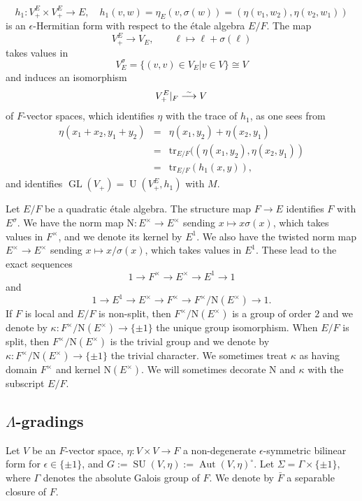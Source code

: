 \documentclass{article}
\def\tx#1{\textrm{#1}}
\def\simto{\buildrel\hbox{\tiny{$\sim$}}\over\longrightarrow}
\DeclareMathOperator{\GL}{GL}
\theoremstyle{definition}
\numberwithin{equation}{subsection}
\renewcommand{\-}{\hyp{}}
\DeclareMathOperator{\SU}{SU}
\DeclareMathOperator{\U}{U}
\DeclareMathOperator{\Aut}{Aut}
\newcommand{\rN}{\mathrm{N}}
\begin{document}
\begin{enumerate}
	\[ h_1 : V_+^E \times V_+^E \to E,\quad h_1(v,w) = \eta_E(v,\sigma(w))=(\eta(v_1,w_2),\eta(v_2,w_1)) \]
	is an $\epsilon$-Hermitian form with respect to the \'etale algebra $E/F$. The map
	\[ V_+^E \to V_E,\qquad \ell \mapsto \ell+\sigma(\ell) \]
	takes values in 
	\[ V_E^\sigma = \{(v,v) \in V_E|v \in V\} \cong V \]
	and induces an isomorphism
	\[ V_+^E|_F \simto V \]
	of $F$-vector spaces, which identifies $\eta$ with the trace of $h_1$, as one sees from 
	\begin{eqnarray*}
		\eta(x_1+x_2,y_1+y_2)&=&\eta(x_1,y_2)+\eta(x_2,y_1)\\
		&=&\tx{tr}_{E/F}((\eta(x_1,y_2),\eta(x_2,y_1))\\
		&=&\tx{tr}_{E/F}(h_1(x,y)),
	\end{eqnarray*}
	and identifies $\GL(V_+)=\U(V_+^E,h_1)$ with $M$.
\end{enumerate}

Let $E/F$ be a quadratic \'etale algebra. The structure map $F \to E$ identifies $F$ with $E^\sigma$. We have the norm map $\rN : E^\times \to E^\times$ sending $x \mapsto x\sigma(x)$, which takes values in $F^\times$, and we denote its kernel by $E^1$. We also have the twisted norm map $E^\times \to E^\times$ 
sending $x \mapsto x/\sigma(x)$, which takes values in $E^1$. These lead to the exact sequences
\[ 1 \to F^\times \to E^\times \to E^1 \to 1 \]
and 
\[ 1 \to E^1 \to E^\times \to F^\times \to F^\times/\rN(E^\times) \to 1. \]
If $F$ is local and $E/F$ is non-split, then $F^\times/\rN(E^\times)$ is a group of order $2$ and we denote by $\kappa : F^\times/\rN(E^\times) \to \{\pm1\}$ the unique group isomorphism. When $E/F$ is split, then $F^\times/\rN(E^\times)$ is the trivial group and we denote by $\kappa : F^\times/\rN(E^\times) \to \{\pm1\}$ the trivial character. We sometimes treat $\kappa$ as having domain $F^\times$ and kernel $\rN(E^\times)$. We will sometimes decorate $\rN$
and $\kappa$ with the subscript $E/F$.

\subsection{$\Lambda$-gradings} \label{sub:lambda}







Let $V$ be an $F$-vector space, $\eta : V \times V \to F$ a non-degenerate $\epsilon$-symmetric bilinear form for $\epsilon \in \{\pm1\}$, and $G:=\SU(V,\eta):=\Aut(V,\eta)^\circ$. Let $\Sigma=\Gamma \times \{\pm1\}$, where $\Gamma$ denotes the absolute Galois group of $F$. We denote by $\bar F$ a separable closure of $F$.
\end{document}
